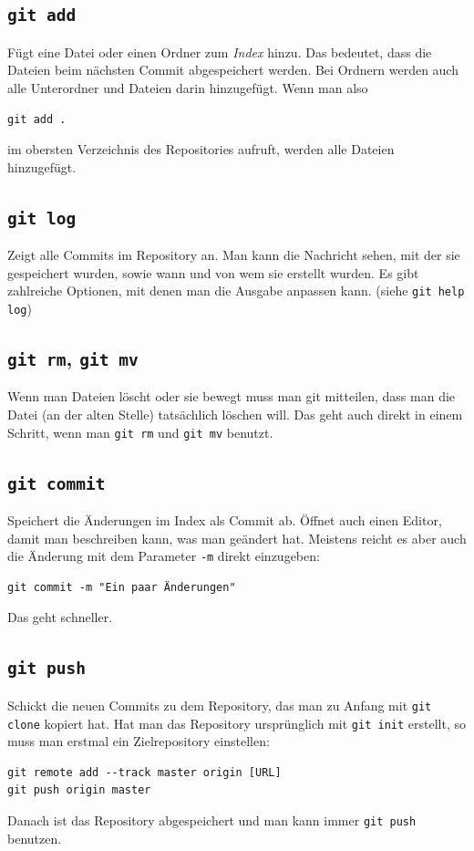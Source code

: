 \subsection{\texttt{git add}}
Fügt eine Datei oder einen Ordner zum \textit{Index} hinzu. Das bedeutet, dass die Dateien beim nächsten Commit abgespeichert werden.
Bei Ordnern werden auch alle Unterordner und Dateien darin hinzugefügt.
Wenn man also
\begin{verbatim}
git add .
\end{verbatim}
im obersten Verzeichnis des Repositories aufruft, werden alle Dateien hinzugefügt.

\subsection{\texttt{git log}}
Zeigt alle Commits im Repository an.
Man kann die Nachricht sehen, mit der sie gespeichert wurden, sowie wann und von wem sie erstellt wurden.
Es gibt zahlreiche Optionen, mit denen man die Ausgabe anpassen kann.
(siehe \verb|git help log|)

\subsection{\texttt{git rm}, \texttt{git mv}}
Wenn man Dateien löscht oder sie bewegt muss man git mitteilen, dass man die Datei (an der alten Stelle) tatsächlich löschen will.
Das geht auch direkt in einem Schritt, wenn man \texttt{git rm} und \texttt{git mv} benutzt.

\subsection{\texttt{git commit}}
Speichert die Änderungen im Index als Commit ab.
Öffnet auch einen Editor, damit man beschreiben kann, was man geändert hat.
Meistens reicht es aber auch die Änderung mit dem Parameter \verb|-m| direkt einzugeben:
\begin{verbatim}
git commit -m "Ein paar Änderungen"
\end{verbatim}
Das geht schneller.

\subsection{\texttt{git push}}
Schickt die neuen Commits zu dem Repository, das man zu Anfang mit \verb|git clone| kopiert hat.
Hat man das Repository ursprünglich mit \verb|git init| erstellt, so muss man erstmal ein Zielrepository einstellen:
\begin{verbatim}
git remote add --track master origin [URL]
git push origin master
\end{verbatim}
Danach ist das Repository abgespeichert und man kann immer \verb|git push| benutzen.

